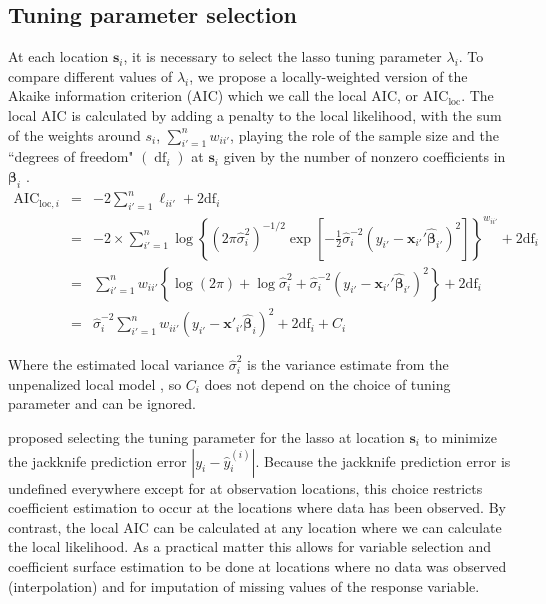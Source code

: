 \documentclass[authoryear, review, 11pt]{elsarticle}
\DeclareMathOperator*{\df}{\mbox{df}}
\begin{document}
	\subsection{Tuning parameter selection}	
	At each location $\bm{s}_i$, it is necessary to select the lasso tuning parameter $\lambda_i$. To compare different values of $\lambda_i$, we propose a locally-weighted version of the Akaike information criterion (AIC) \citep{Akaike:1974} which we call the local AIC, or $\mbox{AIC}_{\text{loc}}$. The local AIC is calculated by adding a penalty to the local likelihood, with the sum of the weights around $s_i$, $\sum_{i'=1}^n w_{ii'}$, playing the role of the sample size and the ``degrees of freedom" $\left( \df_i \right)$ at $\bm{s}_i$ given by the number of nonzero coefficients in $\bm{\beta}_i$ \citep{Zou:2007}.\\
	
	\begin{eqnarray}
		\mbox{AIC}_{\text{loc}, i} &=& -2 \sum_{i'=1}^n \ell_{ii'}  + 2 \mbox{df}_i\\
		&=& -2 \times \sum_{i'=1}^n \log \left\{ \left(2 \pi \hat{\sigma}_i^2\right)^{-1/2} \exp \left[-\frac{1}{2} \hat{\sigma}_i^{-2} \left(y_{i'} - \bm{x}_{i'}' \hat{\bm{\beta}}_{i'} \right)^2\right] \right\}^{w_{ii'}} + 2\mbox{df}_i\\
		&=& \sum_{i'=1}^n w_{ii'} \left\{ \log \left(2 \pi \right) + \log \hat{\sigma}_i^2 + \hat{\sigma}_i^{-2} \left(y_{i'} - \bm{x}_{i'}' \hat{\bm{\beta}}_{i'} \right)^2 \right\} + 2\mbox{df}_i \\
		&=& \hat{\sigma}_i^{-2} \sum_{i'=1}^n w_{ii'} \left( y_{i'} - \bm{x}'_{i'} \hat{\bm{\beta}}_i \right)^2 + 2 \mbox{df}_i + C_i
	\end{eqnarray}	
	
	Where the estimated local variance $\hat{\sigma}_i^2$ is the variance estimate from the unpenalized local model \citep{Zou:2007}, so $C_i$ does not depend on the choice of tuning parameter and can be ignored.
	
	\cite{Wheeler:2009} proposed selecting the tuning parameter for the lasso at location $\bm{s}_i$ to minimize the jackknife prediction error $|y_i - \hat{y}_i^{(i)}|$. Because the jackknife prediction error is undefined everywhere except for at observation locations, this choice restricts coefficient estimation to occur at the locations where data has been observed. By contrast, the local AIC can be calculated at any location where we can calculate the local likelihood. As a practical matter this allows for variable selection and coefficient surface estimation to be done at locations where no data was observed (interpolation) and for imputation of missing values of the response variable.
	 
\end{document}
